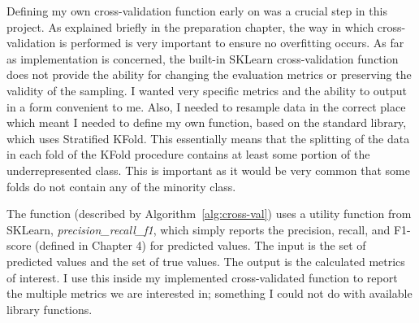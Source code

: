 \documentclass[12pt,a4paper,twoside]{report}
\begin{document}
Defining my own cross-validation function early on was a crucial step in this project. As explained briefly in the preparation chapter, the way in which cross-validation is performed is very important to ensure no overfitting occurs. As far as implementation is concerned, the built-in SKLearn cross-validation function does not provide the ability for changing the evaluation metrics or preserving the validity of the sampling. I wanted very specific metrics and the ability to output in a form convenient to me. Also, I needed to resample data in the correct place which meant I needed to define my own function, based on the standard library, which uses Stratified KFold. This essentially means that the splitting of the data in each fold of the KFold procedure contains at least some portion of the underrepresented class. This is important as it would be very common that some folds do not contain any of the minority class. 

The function (described by Algorithm~\ref{alg:cross-val}) uses a utility function from SKLearn, \emph{precision\_recall\_f1}, which simply reports the precision, recall, and F1-score (defined in Chapter 4) for predicted values. The input is the set of predicted values and the set of true values. The output is the calculated metrics of interest. I use this inside my implemented cross-validated function to report the multiple metrics we are interested in; something I could not do with available library functions. 
\end{document}
